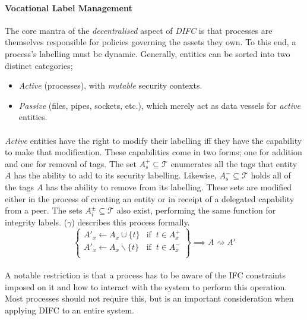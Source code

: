 \paragraph{Vocational Label Management} The core mantra of the \textit{decentralised} aspect of \textit{DIFC} is that processes are themselves responsible for policies governing the assets they own. To this end, a process's labelling must be dynamic. Generally, entities can be sorted into two distinct categories;

\begin{itemize}
    \item \textit{Active} (processes), with \textit{mutable} security contexts.
    \item \textit{Passive} (files, pipes, sockets, etc.), which merely act as data vessels for \textit{active} entities.
\end{itemize}

\paragraph{} \textit{Active} entities have the right to modify their labelling iff they have the capability to make that modification. These capabilities come in two forms; one for addition and one for removal of tags. The set $A_{s}^{+} \subseteq \mathcal{T}$ enumerates all the tags that entity $A$ has the ability to add to its security labelling. Likewise, $A_{s}^{-} \subseteq \mathcal{T}$ holds all of the tags $A$ has the ability to remove from its labelling. These sets are modified either in the process of creating an entity or in receipt of a delegated capability from a peer. The sets $A_{i}^{\pm} \subseteq \mathcal{T}$ also exist, performing the same function for integrity labels. ($\gamma$) describes this process formally.
\begin{equation}
    \left\{\begin{array}{lr}
        A'_x \leftarrow A_x \cup \{t\} & \text{if} \;\; t \in A_{x}^{+} \\
        A'_x \leftarrow A_x \smallsetminus \{t\} & \text{if} \;\; t \in A_{x}^{-} \\
    \end{array}\right\} \implies A \rightsquigarrow A' \tag{$\gamma$}
\end{equation}

\paragraph{} A notable restriction is that a process has to be aware of the IFC constraints imposed on it and how to interact with the system to perform this operation. Most processes should not require this, but is an important consideration when applying DIFC to an entire system.

